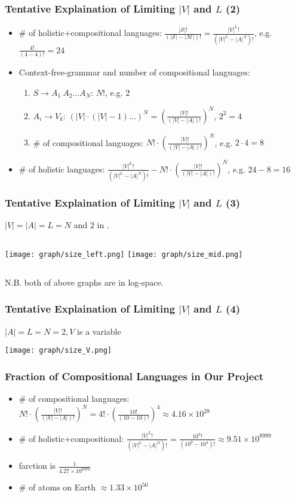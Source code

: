 \documentclass[compress,mathserif,xcolor=dvipsnames,svgnames,aspectratio=43]{beamer}
\begin{document}
\begin{frame}[c]
  \frametitle{Tentative Explaination of Limiting $|V|$ and $L$ (2)}
  \begin{itemize}
    \item \# of holistic+compositional languages: $\frac{|\mathcal{S}|!}{(|\mathcal{S}|-|\mathcal{M}|)!} = \frac{|V|^L !}{(|V|^L - |A|^N)!}$, e.g. $\frac{4!}{(4-4)!}=24$
    \item Context-free-grammar and number of compositional languages:
      \begin{enumerate}
        \item $S\rightarrow A_1\ A_2\dots A_N$: $N!$, e.g. $2$
        \item $A_i\rightarrow V_k$: $(|V|\cdot (|V|-1)\dots)^N = \left(\frac{|V|!}{(|V|-|A|)!}\right)^N$, $2^2 = 4$
        \item \# of compositional languages: $N!\cdot \left(\frac{|V|!}{(|V|-|A|)!}\right)^N$, e.g. $2\cdot 4=8$
      \end{enumerate}
    \item \# of holistic languages: $\frac{|V|^L !}{(|V|^L - |A|^N)!} - N!\cdot \left(\frac{|V|!}{(|V|-|A|)!}\right)^N$, e.g. $24-8=16$
  \end{itemize}
\end{frame}

\begin{frame}[c]
  \frametitle{Tentative Explaination of Limiting $|V|$ and $L$ (3)}
  $|V|=|A|=L=N$ and $2$ in \cite{li2019ease}.
  \begin{columns}
    \texttt{[image: graph/size\_left.png]}
    \texttt{[image: graph/size\_mid.png]}
  \end{columns}
  N.B. both of above graphs are in log-space.
\end{frame}

\begin{frame}[c]
  \frametitle{Tentative Explaination of Limiting $|V|$ and $L$ (4)}
  $|A|=L=N=2, V$ is a variable \\
  \begin{center}
    \texttt{[image: graph/size\_V.png]}
  \end{center}
\end{frame}

\begin{frame}[c]
  \frametitle{Fraction of Compositional Languages in Our Project}
  \begin{itemize}
    \item \# of compositional languages: \\ $N!\cdot \left(\frac{|V|!}{(|V|-|A|)!}\right)^N = 4!\cdot \left(\frac{10!}{(10-10)!}\right)^4 \approx 4.16\times 10^{28}$
    \pause
    \item \# of holistic+compositional: $\frac{|V|^L !}{(|V|^L - |A|^N)!} = \frac{10^9!}{(10^9-10^4)!} \approx 9.51\times 10^{8999}$
    \item farction is $\frac{1}{4.27\times 10^{8970}}$
    \pause
    \item \# of atoms on Earth $\approx 1.33\times 10^{50}$
  \end{itemize}
\end{frame}
\end{document}
